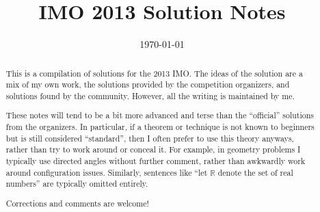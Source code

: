 \documentclass[11pt]{scrartcl}
\title{IMO 2013 Solution Notes}
\date{\today}
\begin{document}
\maketitle

\begin{abstract}
This is a compilation of solutions
for the 2013 IMO.
The ideas of the solution are a mix of my own work,
the solutions provided by the competition organizers,
and solutions found by the community.
However, all the writing is maintained by me.

These notes will tend to be a bit more advanced and terse than the ``official''
solutions from the organizers.
In particular, if a theorem or technique is not known to beginners
but is still considered ``standard'', then I often prefer to
use this theory anyways, rather than try to work around or conceal it.
For example, in geometry problems I typically use directed angles
without further comment, rather than awkwardly work around configuration issues.
Similarly, sentences like ``let $\mathbb{R}$ denote the set of real numbers''
are typically omitted entirely.

Corrections and comments are welcome!
\end{abstract}

\tableofcontents
\newpage

\addtocounter{section}{-1}
\end{document}
